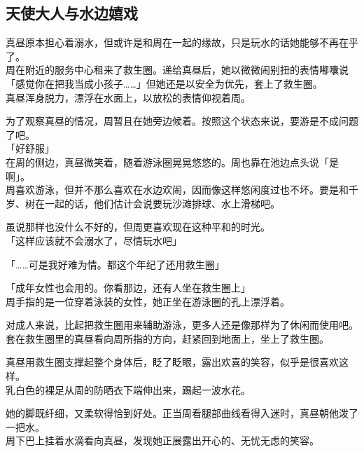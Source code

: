 \subsection{天使大人与水边嬉戏}

真昼原本担心着溺水，但或许是和周在一起的缘故，只是玩水的话她能够不再在乎了。\\

周在附近的服务中心租来了救生圈。递给真昼后，她以微微闹别扭的表情嘟囔说「感觉你在把我当成小孩子……」但她还是以安全为优先，套上了救生圈。\\

真昼浑身脱力，漂浮在水面上，以放松的表情仰视着周。

为了观察真昼的情况，周暂且在她旁边候着。按照这个状态来说，要游是不成问题了吧。\\

「好舒服」\\

在周的侧边，真昼微笑着，随着游泳圈晃晃悠悠的。周也靠在池边点头说「是啊」。\\

周喜欢游泳，但并不那么喜欢在水边欢闹，因而像这样悠闲度过也不坏。要是和千岁、树在一起的话，他们估计会说要玩沙滩排球、水上滑梯吧。

虽说那样也没什么不好的，但周更喜欢现在这种平和的时光。\\

「这样应该就不会溺水了，尽情玩水吧」

「……可是我好难为情。都这个年纪了还用救生圈」

「成年女性也会用的。你看那边，还有人坐在救生圈上」\\

周手指的是一位穿着泳装的女性，她正坐在游泳圈的孔上漂浮着。

对成人来说，比起把救生圈用来辅助游泳，更多人还是像那样为了休闲而使用吧。\\

套在救生圈里的真昼看向周所指的方向，赶紧回到地面上，坐上了救生圈。

真昼用救生圈支撑起整个身体后，眨了眨眼，露出欢喜的笑容，似乎是很喜欢这样。\\

乳白色的裸足从周的防晒衣下端伸出来，踢起一波水花。

她的脚既纤细，又柔软得恰到好处。正当周看腿部曲线看得入迷时，真昼朝他泼了一把水。\\

周下巴上挂着水滴看向真昼，发现她正展露出开心的、无忧无虑的笑容。\\


